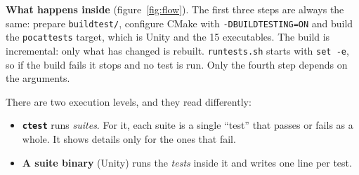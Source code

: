 \documentclass[11pt,a4paper]{article}
\DeclareRobustCommand{\_}{\textunderscore\allowbreak}
\newcommand{\cd}[1]{\texttt{#1}}
\begin{document}
\textbf{What happens inside} (figure~\ref{fig:flow}). The first three steps are always
the same: prepare \cd{build\_test/}, configure CMake with \cd{-DBUILD\_TESTING=ON} and
build the \cd{pocat\_tests} target, which is Unity and the 15 executables. The build is
incremental: only what has changed is rebuilt. \cd{run\_tests.sh} starts with
\cd{set -e}, so if the build fails it stops and no test is run. Only
the fourth step depends on the arguments.

There are two execution levels, and they read differently:
\begin{itemize}
\item \textbf{\cd{ctest}} runs \emph{suites}. For it, each suite is a single ``test'' that
  passes or fails as a whole. It shows details only for the ones that fail.
\item \textbf{A suite binary} (Unity) runs the \emph{tests} inside it and writes one
  line per test.
\end{itemize}
\end{document}

